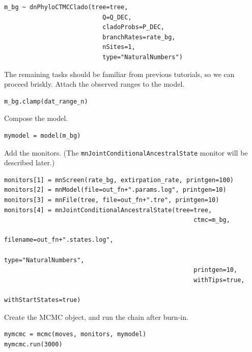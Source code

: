 \begin{snugshade}
\begin{lstlisting}
m_bg ~ dnPhyloCTMCClado(tree=tree,
                           Q=Q_DEC,
                           cladoProbs=P_DEC,
                           branchRates=rate_bg,
                           nSites=1,
                           type="NaturalNumbers")
\end{lstlisting}
\end{snugshade}

The remaining tasks should be familiar from previous tutorials, so we can proceed briskly.
Attach the observed ranges to the model.

\begin{snugshade}
\begin{lstlisting}
m_bg.clamp(dat_range_n)
\end{lstlisting}
\end{snugshade}

Compose the model.

\begin{snugshade}
\begin{lstlisting}
mymodel = model(m_bg)
\end{lstlisting}
\end{snugshade}

Add the monitors. (The {\tt mnJointConditionalAncestralState} monitor will be described later.)

\begin{snugshade}
\begin{lstlisting}
monitors[1] = mnScreen(rate_bg, extirpation_rate, printgen=100)
monitors[2] = mnModel(file=out_fn+".params.log", printgen=10)
monitors[3] = mnFile(tree, file=out_fn+".tre", printgen=10)
monitors[4] = mnJointConditionalAncestralState(tree=tree,
                                                    ctmc=m_bg,
                                                    filename=out_fn+".states.log",
                                                    type="NaturalNumbers",
                                                    printgen=10,
                                                    withTips=true,
                                                    withStartStates=true)
\end{lstlisting}
\end{snugshade}

Create the MCMC object, and run the chain after burn-in.
\begin{snugshade}
\begin{lstlisting}
mymcmc = mcmc(moves, monitors, mymodel)
mymcmc.run(3000)
\end{lstlisting}
\end{snugshade}

